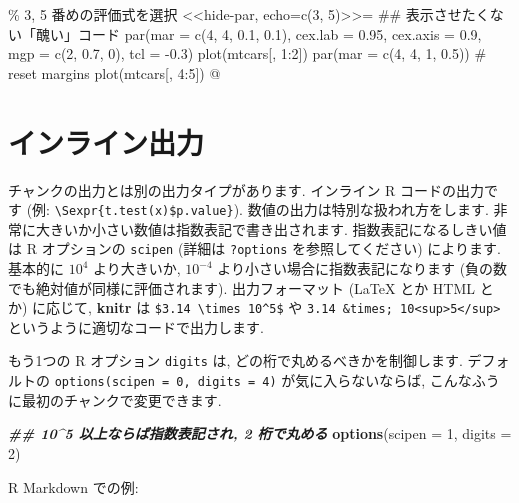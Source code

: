 \documentclass[
  lualatex,ja=standard,jafont=noto-otf]{bxjsreport}
\newenvironment{Shaded}{\begin{snugshade}}{\end{snugshade}}
\newcommand{\AttributeTok}[1]{\textcolor[rgb]{0.13,0.29,0.53}{#1}}
\newcommand{\DecValTok}[1]{\textcolor[rgb]{0.00,0.00,0.81}{#1}}
\newcommand{\DocumentationTok}[1]{\textcolor[rgb]{0.56,0.35,0.01}{\textbf{\textit{#1}}}}
\newcommand{\FunctionTok}[1]{\textcolor[rgb]{0.13,0.29,0.53}{\textbf{#1}}}
\newcommand{\NormalTok}[1]{#1}
\begin{document}
\begin{Shaded}
\begin{Highlighting}[numbers=left,,]
\NormalTok{\% 3, 5 番めの評価式を選択}
\NormalTok{\textless{}\textless{}hide{-}par, echo=c(3, 5)\textgreater{}\textgreater{}=}
\NormalTok{\#\# 表示させたくない「醜い」コード}
\NormalTok{par(mar = c(4, 4, 0.1, 0.1), cex.lab = 0.95, cex.axis = 0.9,}
\NormalTok{    mgp = c(2, 0.7, 0), tcl = {-}0.3)}
\NormalTok{plot(mtcars[, 1:2])}
\NormalTok{par(mar = c(4, 4, 1, 0.5)) \# reset margins}
\NormalTok{plot(mtcars[, 4:5])}
\NormalTok{@}
\end{Highlighting}
\end{Shaded}

\hypertarget{ux30a4ux30f3ux30e9ux30a4ux30f3ux51faux529b}{%
\section*{インライン出力}\label{ux30a4ux30f3ux30e9ux30a4ux30f3ux51faux529b}}

チャンクの出力とは別の出力タイプがあります. インライン R
コードの出力です (例:
\texttt{\textbackslash{}Sexpr\{t.test(x)\$p.value\}}).
数値の出力は特別な扱われ方をします.
非常に大きいか小さい数値は指数表記で書き出されます.
指数表記になるしきい値は R オプションの \texttt{scipen} (詳細は
\texttt{?options} を参照してください) によります. 基本的に \(10^4\)
より大きいか, \(10^{-4}\) より小さい場合に指数表記になります
(負の数でも絶対値が同様に評価されます). 出力フォーマット (LaTeX とか
HTML とか) に応じて, \textbf{knitr} は
\texttt{\$3.14\ \textbackslash{}times\ 10\^{}5\$} や
\texttt{3.14\ \&times;\ 10\textless{}sup\textgreater{}5\textless{}/sup\textgreater{}}
というように適切なコードで出力します.

もう1つの R オプション \texttt{digits} は,
どの桁で丸めるべきかを制御します. デフォルトの
\texttt{options(scipen\ =\ 0,\ digits\ =\ 4)} が気に入らないならば,
こんなふうに最初のチャンクで変更できます.

\begin{Shaded}
\begin{Highlighting}[numbers=left,,]
\DocumentationTok{\#\# 10\^{}5 以上ならば指数表記され, 2 桁で丸める}
\FunctionTok{options}\NormalTok{(}\AttributeTok{scipen =} \DecValTok{1}\NormalTok{, }\AttributeTok{digits =} \DecValTok{2}\NormalTok{)}
\end{Highlighting}
\end{Shaded}

R Markdown での例:
\end{document}

